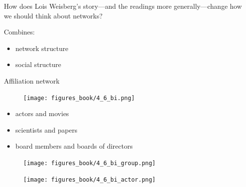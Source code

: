 \documentclass{beamer}
\begin{document}
\begin{frame}

How does Lois Weisberg's story---and the readings more generally---change how we should think about networks?

\pause 

Combines:
\begin{itemize}
\item network structure
\item social structure 
\end{itemize}


\end{frame}
\begin{frame}

Affiliation network
\begin{figure}
  \centering
  \texttt{[image: figures\_book/4\_6\_bi.png]}
\end{figure}
\pause
\begin{itemize}
\item actors and movies
\pause
\item scientists and papers
\pause
\item board members and boards of directors
\end{itemize}


\end{frame}
\begin{frame}

\begin{figure}
  \centering
  \texttt{[image: figures\_book/4\_6\_bi\_group.png]}
\end{figure}

\end{frame}
\begin{frame}

\begin{figure}
  \centering
  \texttt{[image: figures\_book/4\_6\_bi\_actor.png]}
\end{figure}

\end{frame}
\end{document}
